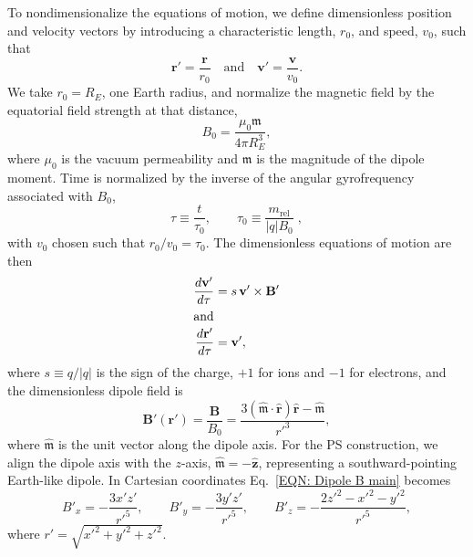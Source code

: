 \documentclass{article}
\begin{document}
To nondimensionalize the equations of motion, we define dimensionless position and velocity vectors by introducing a characteristic length, $r_0$, and speed,
$v_0$, such that
        \begin{equation*}
            \mathbf{r'}=\frac{\mathbf{r}}{r_0}\quad\mbox{and}\quad
            \mathbf{v'}=\frac{\mathbf{v}}{v_0}.
        \end{equation*}
We take $r_0 = R_E$, one Earth radius, and normalize the magnetic field by the equatorial field strength at that distance,
        \begin{equation*}
            B_0 = \frac{\mu_0 \mathfrak{m}}{4\pi R_E^3},
        \end{equation*}
where $\mu_0$ is the vacuum permeability and $\mathfrak{m}$ is the magnitude of the dipole moment. Time is normalized by the inverse of the angular gyrofrequency associated with $B_0$,
        \begin{equation*}
            \tau\equiv\frac{t}{\tau_0},\qquad
            \tau_0\equiv\frac{m_{\text{rel}}}{|q|B_0}\;,
        \end{equation*}
with $v_0$ chosen such that $r_0/v_0=\tau_0$. The dimensionless equations of motion are then
        \begin{align}
            \frac{d\mathbf{v'}}{d\tau} &= s\,\mathbf{v'}\times \mathbf{B'}
            \label{EQN: Rep Lorentz}\\
        \intertext{and}
            \frac{d\mathbf{r'}}{d\tau} &= \mathbf{v'},
            \label{EQN: Rep dr/dt}
        \end{align}
where $s \equiv q/|q|$ is the sign of the charge, $+1$ for ions and $-1$ for electrons, and the dimensionless dipole field is
        \begin{equation}
            \mathbf{B'}(\mathbf{r'})=\frac{\mathbf{B}}{B_0}
            =\frac{3(\hat{\boldsymbol{\mathfrak{m}}}\cdot\hat{\mathbf{r}})\hat{\mathbf{r}}
            - \hat{\boldsymbol{\mathfrak{m}}}}{r'^3},
            \label{EQN: Dipole B main}
        \end{equation}
where $\hat{\boldsymbol{\mathfrak{m}}}$ is the unit vector along the dipole axis. For the PS construction, we align the dipole axis with the $z$-axis, $\hat{\boldsymbol{\mathfrak{m}}} = -\hat{\mathbf{z}}$, representing a southward-pointing Earth-like dipole. In Cartesian coordinates Eq.~\eqref{EQN: Dipole B main} becomes
        \begin{equation}
            B'_x = -\frac{3x'z'}{r'^5}, \qquad
            B'_y = -\frac{3y'z'}{r'^5}, \qquad
            B'_z = -\frac{2z'^2 - x'^2 - y'^2}{r'^5},
            \label{EQN: Dipole B components}
        \end{equation}
where $r' = \sqrt{x'^2 + y'^2 + z'^2}$. 
\end{document}
